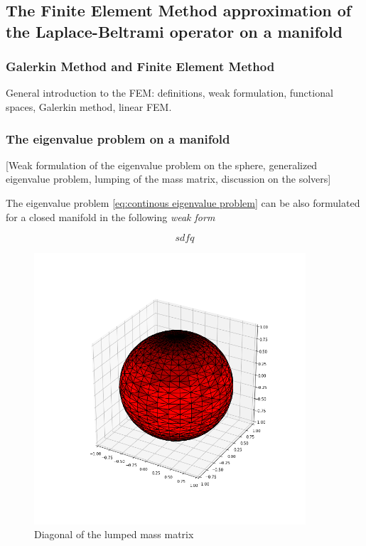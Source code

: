 \subsection{The Finite Element Method approximation of the Laplace-Beltrami operator on a manifold}\label{sec:Chapter3: Using the Finite Element Method to approximate the Laplace-Beltrami operator on a manifold}


\subsubsection{Galerkin Method and Finite Element Method}
General introduction to the FEM: definitions, weak formulation, functional spaces, Galerkin method, linear FEM.
\subsubsection{The eigenvalue problem on a manifold}
[Weak formulation of the eigenvalue problem on the sphere, generalized eigenvalue problem, lumping of the mass matrix, discussion on the solvers]

The eigenvalue problem \ref{eq:continous eigenvalue problem} can be also formulated for a closed manifold in the following \textit{weak form}

\begin{equation}\label{eq:weak eigenvalue problem}
sdfq
\end{equation}

\begin{figure}[h]
	\label{fig:Lumping}
	\centering
	\includegraphics[width=0.9\textwidth]{../codes/03.FEM_laplacian/equiangular/normal/img/mass_matrix_diagonal.png}

	\caption{Diagonal of the lumped mass matrix}
\end{figure}
